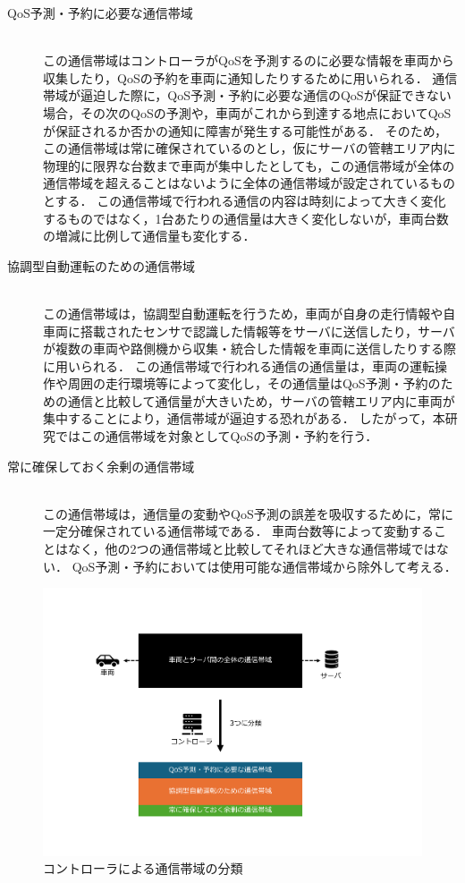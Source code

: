 \documentclass[a4paper,11pt,uplatex]{ujreport}
\begin{document}
\begin{description}
  \item[QoS予測・予約に必要な通信帯域]\mbox{}\\
    この通信帯域はコントローラがQoSを予測するのに必要な情報を車両から収集したり，QoSの予約を車両に通知したりするために用いられる．
    通信帯域が逼迫した際に，QoS予測・予約に必要な通信のQoSが保証できない場合，その次のQoSの予測や，車両がこれから到達する地点においてQoSが保証されるか否かの通知に障害が発生する可能性がある．
    そのため，この通信帯域は常に確保されているのとし，仮にサーバの管轄エリア内に物理的に限界な台数まで車両が集中したとしても，この通信帯域が全体の通信帯域を超えることはないように全体の通信帯域が設定されているものとする．
    この通信帯域で行われる通信の内容は時刻によって大きく変化するものではなく，1台あたりの通信量は大きく変化しないが，車両台数の増減に比例して通信量も変化する．
  \item [協調型自動運転のための通信帯域]\mbox{}\\
    この通信帯域は，協調型自動運転を行うため，車両が自身の走行情報や自車両に搭載されたセンサで認識した情報等をサーバに送信したり，サーバが複数の車両や路側機から収集・統合した情報を車両に送信したりする際に用いられる．
    この通信帯域で行われる通信の通信量は，車両の運転操作や周囲の走行環境等によって変化し，その通信量はQoS予測・予約のための通信と比較して通信量が大きいため，サーバの管轄エリア内に車両が集中することにより，通信帯域が逼迫する恐れがある．
    したがって，本研究ではこの通信帯域を対象としてQoSの予測・予約を行う．
  \item [常に確保しておく余剰の通信帯域]\mbox{}\\
    この通信帯域は，通信量の変動やQoS予測の誤差を吸収するために，常に一定分確保されている通信帯域である．
    車両台数等によって変動することはなく，他の2つの通信帯域と比較してそれほど大きな通信帯域ではない．
    QoS予測・予約においては使用可能な通信帯域から除外して考える．
\end{description}

  \begin{figure}[tb]
    \centering
    \includegraphics[width=\linewidth]{img/コントローラによる通信帯域の分類2.pdf}
    \caption{コントローラによる通信帯域の分類}
    \label{fig:bandwidth}
  \end{figure}
\end{document}
